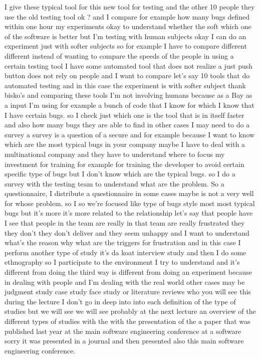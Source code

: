 \documentclass[conference, compsoc, twoside]{IEEEtran}
\begin{document}
I give these typical tool for this new tool for testing and the other 10 people they use the old testing tool ok ? and I compare 
for example how many bugs defined within one hour my experiments okay to understand whether the soft which one of the software is better but I'm testing with human subjects okay I can do an experiment just with softer subjects so 
for example I have to compare different different instead of wanting to compare the speeds of the people in using a certain testing tool I have some automated tool that does not realize a just push button does not rely on people and I want to compare let's say 10 tools that do automated testing and in this case the experiment is with softer subject thank bisko's and comparing these tools I'm not involving humans because as a Bay as a input I'm using 
for example a bunch of code that I know for which I know that I have certain bugs. 
so I check just which one is the tool that is in itself faster and also how many bugs they are able to find in other cases I may need to do a survey a survey is a question of a secure and 
for example because I want to know which are the most typical bugs in your company maybe I have to deal with a multinational company and they have to understand where to focus my investment for training 
for example for training the developer to avoid certain specific type of bugs but I don't know which are the typical bugs.
so I do a survey with the testing team to understand what are the problem. 
So a questionnaire, I distribute a questionnaire in some cases maybe is not a very well for whose problem. 
so I so we're focused like type of bugs style most most typical bugs but it's more it's more related to the relationship let's say that people have I see that people in the team are really in that team are really frustrated they they don't they don't deliver and they seem unhappy and I want to understand what's the reason why what are the triggers for frustration and in this case I perform another type of study it's da koat interview study and then I do some ethnography 
so I participate to the environment I try to understand and it's different from doing the third way is different from doing an experiment because in dealing with people and I'm dealing with the real world other cases may be judgment study case study face study or literature reviews who you will see this during the lecture I don't go in deep into into each definition of the type of studies but we will see we will see probably at the next lecture an overview of the different types of studies with the with the presentation of the a paper that was published last year at the main software engineering conference at a software sorry it was presented in a journal and then presented also this main software engineering conference.
\end{document}

